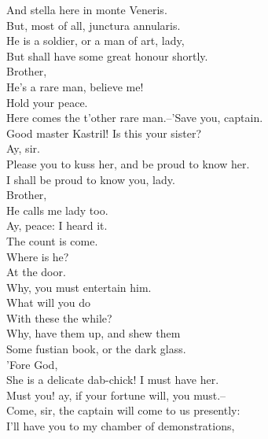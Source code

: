 \documentclass{memoir}
\begin{document}
\begin{drama*}
 And stella here in monte Veneris.\\
 But, most of all, junctura annularis.\\
 He is a soldier, or a man of art, lady,\\
 But shall have some great honour shortly.\\
\pliantspeaks  Brother,\\
 He's a rare man, believe me!\\
\kastrilspeaks {} Hold your peace.\\
 Here comes the t'other rare man.--'Save you, captain.\\
\facespeaks  Good master Kastril! Is this your sister?\\
\kastrilspeaks  Ay, sir.\\
 Please you to kuss her, and be proud to know her.\\
\facespeaks  I shall be proud to know you, lady.\\
\pliantspeaks {} Brother,\\
 He calls me lady too.\\
\kastrilspeaks {} Ay, peace: I heard it.\\
\facespeaks  The count is come.\\
\subtlespeaks {} Where is he?\\
\facespeaks {} At the door.\\
\subtlespeaks  Why, you must entertain him.\\
\facespeaks {} What will you do\\
 With these the while?\\
\subtlespeaks {} Why, have them up, and shew them\\
 Some fustian book, or the dark glass.\\
\facespeaks {} 'Fore God,\\
 She is a delicate dab-chick! I must have her.\\
\subtlespeaks  Must you! ay, if your fortune will, you must.--\\
 Come, sir, the captain will come to us presently:\\
 I'll have you to my chamber of demonstrations,\\

\end{drama*}
\end{document}
